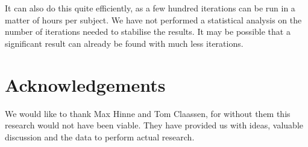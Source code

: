 \documentclass[a4paper, 10pt, english, onecolumn]{article}
\begin{document}
It can also do this quite efficiently, as a few hundred iterations can be run in a matter of hours per subject.
We have not performed a statistical analysis on the number of iterations needed to stabilise the results.
It may be possible that a significant result can already be found with much less iterations.


\section{Acknowledgements}
We would like to thank Max Hinne and Tom Claassen, for without them this research would not have been viable.
They have provided us with ideas, valuable discussion and the data to perform actual research.

{}

\end{document}
